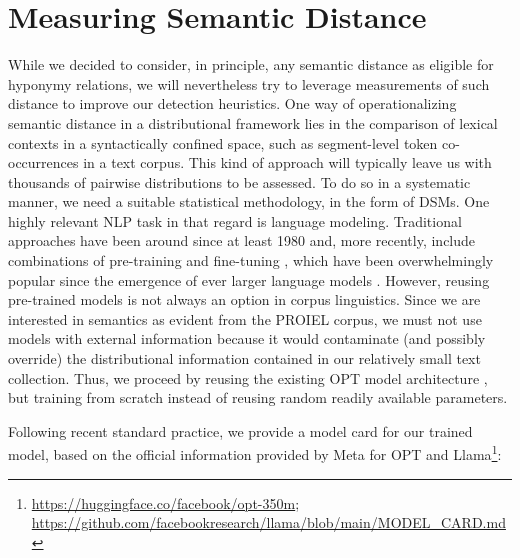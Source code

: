 \section{Measuring Semantic Distance}
While we decided to consider, in principle, any semantic distance as eligible for hyponymy relations, we will nevertheless try to leverage measurements of such distance to improve our detection heuristics. One way of operationalizing semantic distance in a distributional framework lies in the comparison of lexical contexts in a syntactically confined space, such as segment-level token co-occurrences in a text corpus. This kind of approach will typically leave us with thousands of pairwise distributions to be assessed. To do so in a systematic manner, we need a suitable statistical methodology, in the form of \gls{DSM}s. One highly relevant \gls{NLP} task in that regard is language modeling. Traditional approaches have been around since at least 1980 \parencite[1270]{rosenfeldTwoDecadesStatistical2000} and, more recently, include combinations of pre-training and fine-tuning \parencite[1547]{hintonFastLearningAlgorithm2006}, which have been overwhelmingly popular since the emergence of ever larger language models \parencites{devlinBERTPretrainingDeep2019}{lewisBartDenoisingSequencetosequence2019}{songMassMaskedSequence2019}{ben-davidPERLPivotbasedDomain2020}{chungRethinkingEmbeddingCoupling2020}{joshiSpanBERTImprovingPretraining2020}{kaleNmT5IsParallelData2021}{luKELMKnowledgeEnhanced2021}{wangERNIE30Titan2021}{zouControllableGenerationPretrained2021}{cuiPERTPretrainingBERT2022}{zhangOPTOpenPretrained2022}. However, reusing pre-trained models is not always an option in corpus linguistics. Since we are interested in semantics as evident from the PROIEL corpus, we must not use models with external information because it would contaminate (and possibly override) the distributional information contained in our relatively small text collection. 
Thus, we proceed by reusing the existing OPT model architecture \parencite{zhangOPTOpenPretrained2022}, but training from scratch instead of reusing random readily available parameters. 

Following recent standard practice, we provide a model card \parencite[222]{mitchellModelCardsModel2019} for our trained model, based on the official information provided by Meta for OPT and Llama\footnote{\url{https://huggingface.co/facebook/opt-350m}; \url{https://github.com/facebookresearch/llama/blob/main/MODEL_CARD.md}}:
